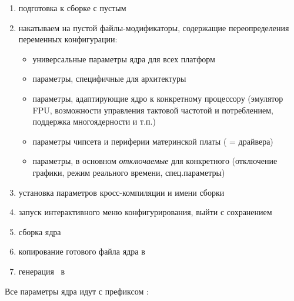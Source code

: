 \begin{enumerate}
  \item подготовка к сборке с пустым 
  \item накатываем на пустой  файлы-модификаторы, содержащие
  переопределения переменных конфигурации:
  \begin{itemize}
    \item {} универсальные параметры ядра для всех платформ
    \item {} параметры, специфичные для архитектуры
    \item {} параметры, адаптирующие ядро к конкретному процессору
    (эмулятор FPU, возможности управления тактовой частотой и потреблением,
    поддержка многоядерности и т.п.)
    \item {} параметры чипсета и периферии материнской платы
    ( = драйвера)
    \item {} параметры, в основном \emph{отключаемые} для конкретного
     (отключение графики, режим реального времени,
    спец.параметры)
  \end{itemize}
  \item установка параметров кросс-компиляции и имени сборки
  \item запуск интерактивного меню конфигурирования, выйти с сохранением
  \item сборка ядра
  \item копирование готового файла ядра в 
  \item генерация \ в 
\end{enumerate}

\bigskip
Все параметры ядра идут с префиксом :

